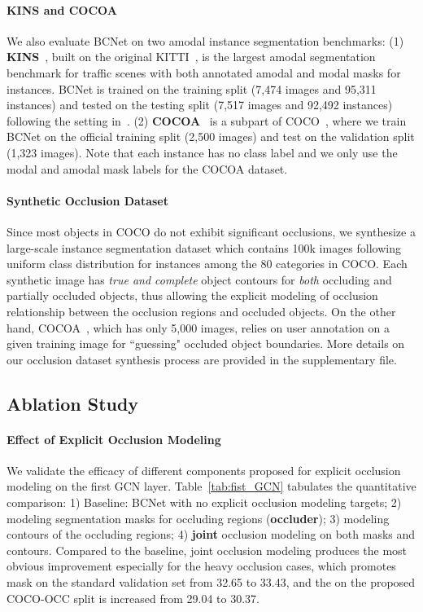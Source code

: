 \paragraph{KINS and COCOA}
We also evaluate BCNet on two amodal instance segmentation benchmarks: 
(1) \textbf{KINS}~\cite{qi2019amodal}, built on the original KITTI~\cite{geiger2012we}, is the largest amodal segmentation benchmark for traffic scenes with both annotated amodal and modal masks for instances. BCNet is trained on the training split (7,474 images and 95,311 instances) and tested on the testing split (7,517 images and 92,492 instances) following the setting in~\cite{qi2019amodal}.
(2) \textbf{COCOA}~\cite{zhu2017semantic} is a subpart of COCO~\cite{lin2014microsoft}, where we train BCNet on the official training split (2,500 images) and test on the validation split (1,323 images). Note that each instance has no class label and we only use the modal and amodal mask labels for the COCOA dataset.

\paragraph{Synthetic Occlusion Dataset}
Since most objects in COCO do not exhibit significant occlusions, we synthesize a large-scale instance segmentation dataset which contains 100k  images following uniform class distribution for instances among the 80 categories in COCO. Each synthetic image has \textit{true and complete} object contours for {\em both} occluding and partially occluded objects, thus allowing the explicit modeling of occlusion relationship between the occlusion regions and occluded objects. On the other hand, COCOA~\cite{zhu2017semantic}, which has only 5,000 images, relies on user annotation on a given training image for ``guessing" occluded object boundaries. More details on our occlusion dataset synthesis process are provided in the supplementary file.  

\subsection{Ablation Study}

\paragraph{Effect of Explicit Occlusion Modeling} We validate the efficacy of different components proposed for explicit occlusion modeling on the first GCN layer. Table~\ref{tab:fist_GCN} tabulates the  quantitative comparison: 1) Baseline: BCNet with no explicit occlusion modeling targets; 2) modeling segmentation masks for occluding regions (\textbf{occluder}); 3)  modeling contours of the occluding regions; 4) \textbf{joint} occlusion modeling on both masks and contours.   Compared to the baseline, joint occlusion modeling produces the most obvious improvement especially for the heavy occlusion cases, which promotes mask  on the standard validation set from 32.65 to 33.43, and the  on the proposed COCO-OCC split is increased from 29.04 to 30.37.

